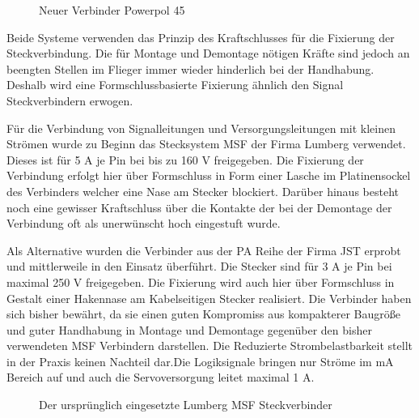 \begin{figure}[H]
\centering
{}
\caption{Neuer Verbinder  Powerpol 45} 
\label{fig:Neuer Verbinder  Powerpol 45}
\end{figure}


Beide Systeme verwenden das Prinzip des Kraftschlusses für die Fixierung der Steckverbindung. Die für Montage und Demontage nötigen Kräfte sind jedoch an beengten Stellen im Flieger immer wieder hinderlich bei der Handhabung. Deshalb wird eine Formschlussbasierte Fixierung ähnlich den Signal Steckverbindern erwogen.

Für die Verbindung von Signalleitungen  und Versorgungsleitungen mit kleinen Strömen wurde zu Beginn das Stecksystem MSF der Firma Lumberg verwendet.
Dieses ist für 5 A je Pin bei bis zu 160 V freigegeben. Die Fixierung der Verbindung erfolgt hier über Formschluss in Form einer Lasche im Platinensockel des Verbinders welcher eine Nase am Stecker blockiert. Darüber hinaus besteht noch eine gewisser Kraftschluss über die Kontakte der bei der Demontage der Verbindung oft als unerwünscht hoch eingestuft wurde.

Als Alternative wurden die Verbinder aus der PA Reihe der Firma JST erprobt und mittlerweile in den Einsatz überführt.
Die Stecker sind für 3 A je Pin bei maximal 250 V freigegeben.
Die Fixierung wird auch hier über Formschluss in Gestalt einer Hakennase am Kabelseitigen Stecker realisiert.
Die Verbinder haben sich bisher bewährt, da sie einen guten Kompromiss aus kompakterer Baugröße und guter Handhabung in Montage und Demontage gegenüber den bisher verwendeten MSF Verbindern darstellen.
Die Reduzierte Strombelastbarkeit stellt in der Praxis keinen Nachteil dar.Die Logiksignale bringen nur Ströme im mA Bereich auf und auch die Servoversorgung leitet maximal 1 A.

\begin{figure}[H]
\centering
{}
\caption{Der ursprünglich eingesetzte Lumberg MSF Steckverbinder} 
\label{fig:Der ursprünglich eingesetzte Lumberg MSF Steckverbinder}
\end{figure}


